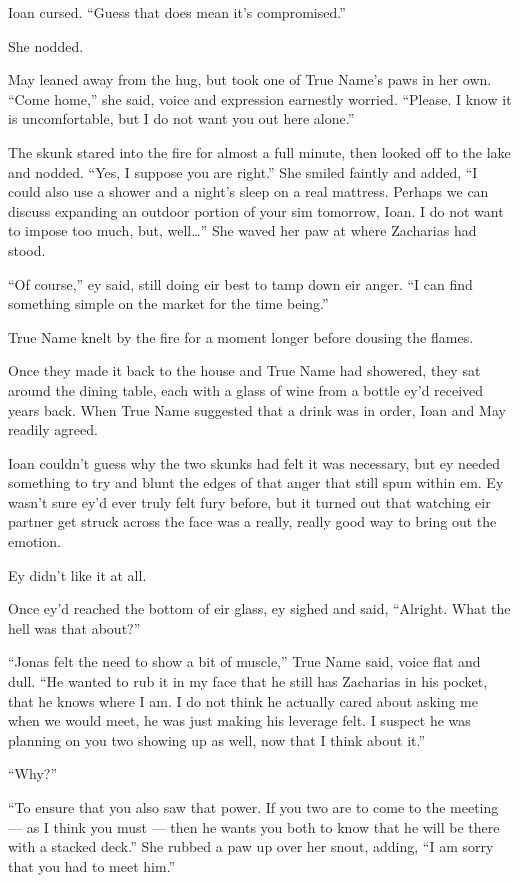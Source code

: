 Ioan cursed. ``Guess that does mean it's compromised.''

She nodded.

May leaned away from the hug, but took one of True Name's paws in her own. ``Come home,'' she said, voice and expression earnestly worried. ``Please. I know it is uncomfortable, but I do not want you out here alone.''

The skunk stared into the fire for almost a full minute, then looked off to the lake and nodded. ``Yes, I suppose you are right.'' She smiled faintly and added, ``I could also use a shower and a night's sleep on a real mattress. Perhaps we can discuss expanding an outdoor portion of your sim tomorrow, Ioan. I do not want to impose too much, but, well\ldots{}'' She waved her paw at where Zacharias had stood.

``Of course,'' ey said, still doing eir best to tamp down eir anger. ``I can find something simple on the market for the time being.''

True Name knelt by the fire for a moment longer before dousing the flames.

Once they made it back to the house and True Name had showered, they sat around the dining table, each with a glass of wine from a bottle ey'd received years back. When True Name suggested that a drink was in order, Ioan and May readily agreed.

Ioan couldn't guess why the two skunks had felt it was necessary, but ey needed something to try and blunt the edges of that anger that still spun within em. Ey wasn't sure ey'd ever truly felt fury before, but it turned out that watching eir partner get struck across the face was a really, really good way to bring out the emotion.

Ey didn't like it at all.

Once ey'd reached the bottom of eir glass, ey sighed and said, ``Alright. What the hell was that about?''

``Jonas felt the need to show a bit of muscle,'' True Name said, voice flat and dull. ``He wanted to rub it in my face that he still has Zacharias in his pocket, that he knows where I am. I do not think he actually cared about asking me when we would meet, he was just making his leverage felt. I suspect he was planning on you two showing up as well, now that I think about it.''

``Why?''

``To ensure that you also saw that power. If you two are to come to the meeting — as I think you must — then he wants you both to know that he will be there with a stacked deck.'' She rubbed a paw up over her snout, adding, ``I am sorry that you had to meet him.''

